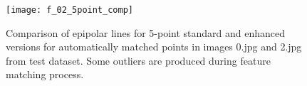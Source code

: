 \begin{figure}[h!]
    \centering
    \texttt{[image: f\_02\_5point\_comp]}
    \caption[Comparison of epipolar lines for 5-point standard and enhanced versions  - 2nd example]{Comparison of epipolar lines for 5-point standard and enhanced versions for automatically matched points in images 0.jpg and 2.jpg from test dataset. Some outliers are produced during feature matching process.}
    \label{fig:f_02_5point_epi_comp}
\end{figure}


